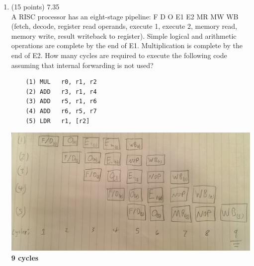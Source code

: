 \documentclass[letterpaper,10pt,onecolumn,titlepage]{article}
\begin{document}
\begin{enumerate}
\item (15 points) 7.35 \\
	A RISC processor has an eight-stage pipeline: F D O E1 E2 MR MW WB (fetch, decode,
	register read operands, execute 1, execute 2, memory read, memory write, result
	writeback to register). Simple logical and arithmetic operations are complete by
	the end of E1. Multiplication is complete by the end of E2. How many cycles are
	required to execute the following code assuming that internal forwarding is not
	used?
	\begin{verbatim}
	(1) MUL   r0, r1, r2
	(2) ADD   r3, r1, r4
	(3) ADD   r5, r1, r6
	(4) ADD   r6, r5, r7
	(5) LDR   r1, [r2]
	\end{verbatim}
	\includegraphics[width=5in]{images/7_35.eps} \\
	{\Large{\textbf{9 cycles}}}


\end{enumerate}
\end{document}
